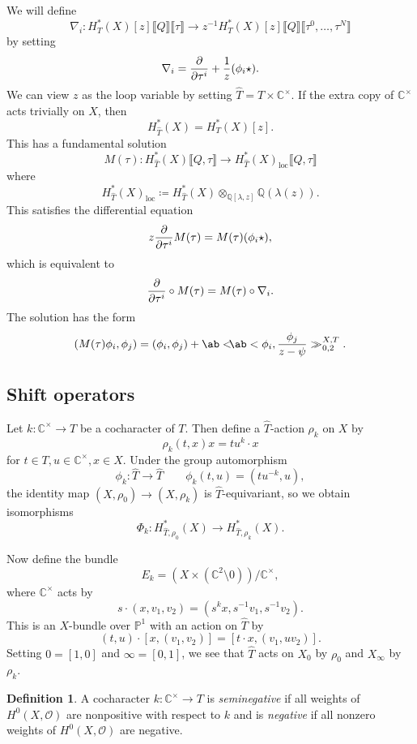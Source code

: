 \documentclass[leqno, openany]{memoir}
\theoremstyle{definition}
\newtheorem{defn}[thm]{Definition}
\theoremstyle{remark}
\theoremstyle{plain}
\theoremstyle{definition}
\theoremstyle{remark}
\newcommand{\C}{\mathbb{C}}
\newcommand{\Q}{\mathbb{Q}}
\renewcommand{\P}{\mathbb{P}}
\newcommand{\mc}[1]{\mathcal{#1}}
\newcommand{\mr}[1]{\mathrm{#1}}
\newcommand{\wh}[1]{\widehat{#1}}
\begin{document}
We will define
\[ \nabla_i \colon H_T^*(X)[z] \llbracket Q \rrbracket \llbracket\tau\rrbracket \to z^{-1} H_T^*(X)[z] \llbracket Q \rrbracket \llbracket\tau^0, \ldots, \tau^N\rrbracket \]
by setting
\[ \nabla_i = \pdv{}{\tau^i} + \frac{1}{z} (\phi_i \star). \]
We can view $z$ as the loop variable by setting $\wh{T} = T \times \C^{\times}$. If the extra copy of $\C^{\times}$ acts trivially on $X$, then
\[ H_{\wh{T}}^*(X) = H_T^*(X)[z]. \]
This has a fundamental solution
\[ M(\tau) \colon H_{\wh{T}}^*(X) \llbracket Q, \tau \rrbracket \to H_{\wh{T}}^*(X)_{\mr{loc}} \llbracket Q, \tau \rrbracket \]
where
\[ H_{\wh{T}}^*(X)_{\mr{loc}} \coloneqq H_{\wh{T}}^*(X) \otimes_{\Q[\lambda,z]} \Q(\lambda(z)). \]
This satisfies the differential equation
\[ z \pdv{}{\tau^i} M(\tau) = M(\tau) (\phi_i \star), \]
which is equivalent to
\[ \pdv{}{\tau^i} \circ M(\tau) = M(\tau) \circ \nabla_i. \]
The solution has the form
\[ (M(\tau) \phi_i, \phi_j) = (\phi_i, \phi_j) + \ab<\!\!\! \ab< \phi_i, \frac{\phi_j}{z-\psi}>\!\!\!>_{0,2}^{X,T}. \]

\subsection{Shift operators}%
\label{sub:Shift operators}

Let $k \colon \C^{\times} \to T$ be a cocharacter of $T$. Then define a $\wh{T}$-action $\rho_k$ on $X$ by
\[ \rho_k(t,x) x = t u^k \cdot x \]
for $t \in T, u \in \C^{\times}, x \in X$. Under the group automorphism
\[ \phi_k \colon \wh{T} \to \wh{T} \qquad \phi_k(t,u) = (tu^{-k}, u), \]
the identity map $(X, \rho_0) \to (X, \rho_k)$ is $\wh{T}$-equivariant, so we obtain isomorphisms
\[ \Phi_k \colon H_{\wh{T}, \rho_0}^*(X) \to H_{\wh{T}, \rho_k}^*(X). \]

Now define the bundle
\[ E_k = (X \times (\C^2 \setminus 0)) / \C^{\times}, \]
where $\C^{\times}$ acts by
\[ s \cdot (x, v_1, v_2) = (s^k x, s^{-1}v_1, s^{-1} v_2). \]
This is an $X$-bundle over $\P^1$ with an action on $\wh{T}$ by
\[ (t,u) \cdot [x, (v_1, v_2)] = [t \cdot x, (v_1, u v_2)]. \]
Setting $0 = [1,0]$ and $\infty = [0,1]$, we see that $\wh{T}$ acts on $X_0$ by $\rho_0$ and $X_{\infty}$ by $\rho_k$.

\begin{defn}
    A cocharacter $k \colon \C^{\times} \to T$ is \textit{seminegative} if all weights of $H^0(X, \mc{O})$ are nonpositive with respect to $k$ and is \textit{negative} if all nonzero weights of $H^0(X, \mc{O})$ are negative.
\end{defn}
\end{document}
